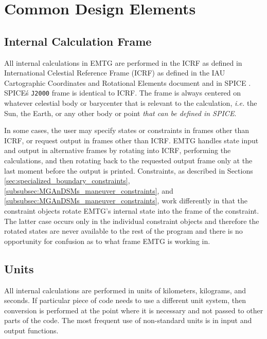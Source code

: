 \chapter{Common Design Elements}
\label{chap:common}

\section{Internal Calculation Frame}
\label{sec:internal_calculation_frame}

All internal calculations in EMTG are performed in the \ac{ICRF} as defined in International Celestial Reference Frame (ICRF) as defined in the \ac{IAU} Cartographic Coordinates and Rotational Elements document \cite{IAU_cartographic_coordinates_2018} and in \ac{SPICE} \cite{SPICE}. SPICE\'s \texttt{J2000} frame is identical to ICRF. The frame is always centered on whatever celestial body or barycenter that is relevant to the calculation, \textit{i.e.} the Sun, the Earth, or any other body or point \textit{that can be defined in SPICE}.

In some cases, the user may specify states or constraints in frames other than ICRF, or request output in frames other than ICRF. EMTG handles state input and output in alternative frames by rotating into ICRF, performing the calculations, and then rotating back to the requested output frame only at the last moment before the output is printed. Constraints, as described in Sections \ref{sec:specialized_boundary_constraints}, \ref{subsubsec:MGAnDSMs_maneuver_constraints}, and \ref{subsubsec:MGAnDSMs_maneuver_constraints}, work differently in that the constraint objects rotate EMTG's internal state into the frame of the constraint. The latter case occurs only in the individual constraint objects and therefore the rotated states are never available to the rest of the program and there is no opportunity for confusion as to what frame EMTG is working in.

\section{Units}
\label{sec:units}

All internal calculations are performed in units of kilometers, kilograms, and seconds. If particular piece of code needs to use a different unit system, then conversion is performed at the point where it is necessary and not passed to other parts of the code. The most frequent use of non-standard units is in input and output functions.